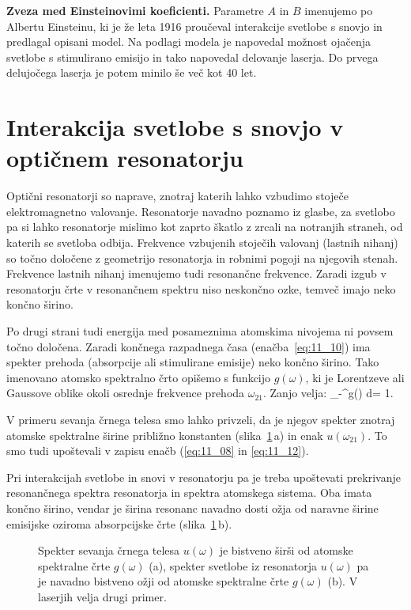 \begin{example}{\bf Zveza med Einsteinovimi koeficienti.}
Parametre $A$ in $B$ imenujemo po Albertu Einsteinu, ki je že leta 
1916 proučeval interakcije svetlobe s snovjo in predlagal opisani model. 
Na podlagi modela je napovedal možnost ojačenja svetlobe s stimulirano 
emisijo in tako napovedal delovanje laserja. Do prvega delujočega laserja 
je potem minilo še  več kot 40 let. 
\end{example}

\section{Interakcija svetlobe s snovjo v optičnem resonatorju}
Optični resonatorji so naprave, znotraj katerih lahko vzbudimo 
stoječe elektromagnetno valovanje. Resonatorje navadno poznamo iz glasbe,
za svetlobo pa si lahko resonatorje mislimo kot zaprto škatlo
z zrcali na notranjih straneh, od katerih se svetloba odbija.
Frekvence vzbujenih stoječih valovanj (lastnih nihanj) so točno 
določene z geometrijo resonatorja in robnimi pogoji na njegovih stenah. 
Frekvence lastnih nihanj imenujemo tudi resonančne frekvence. 
Zaradi izgub v resonatorju črte v resonančnem spektru niso 
neskončno ozke, temveč imajo neko končno širino.

Po drugi strani tudi energija med posameznima atomskima nivojema 
ni povsem točno določena. Zaradi končnega razpadnega časa 
(enačba~\ref{eq:11_10}) ima spekter prehoda (absorpcije ali 
stimulirane emisije) neko končno širino. Tako imenovano
atomsko spektralno črto opišemo s funkcijo $g(\omega)$,
ki je Lorentzeve ali  Gaussove oblike okoli osrednje 
frekvence prehoda $\omega_{21}$. Zanjo velja:
\beq
\int_{-\infty}^\infty g(\omega) d\omega = 1.
\label{eq:11_21}
\eeq

V primeru sevanja črnega telesa smo lahko privzeli, 
da je njegov spekter znotraj atomske spektralne širine 
približno konstanten (slika~\ref{fig:11_g}\,a) in enak $u(\omega_{21})$.
To smo tudi upoštevali v zapisu enačb (\ref{eq:11_08} in \ref{eq:11_12}). 

Pri interakcijah svetlobe in snovi v resonatorju pa je treba
upoštevati prekrivanje resonančnega spektra resonatorja in 
spektra atomskega sistema. Oba imata končno širino, vendar 
je širina resonanc navadno dosti ožja od naravne širine 
emisijske oziroma absorpcijske črte (slika~\ref{fig:11_g}\,b).
\begin{figure}[h!]
\centering
\def\svgwidth{120truemm} 

\caption{Spekter sevanja črnega telesa $u(\omega)$ je bistveno širši 
od atomske spektralne črte $g(\omega)$ (a), spekter svetlobe iz 
resonatorja $u(\omega)$ pa je navadno bistveno ožji od atomske 
spektralne črte $g(\omega)$ (b). V laserjih velja drugi primer.
}
\label{fig:11_g}
\end{figure}

